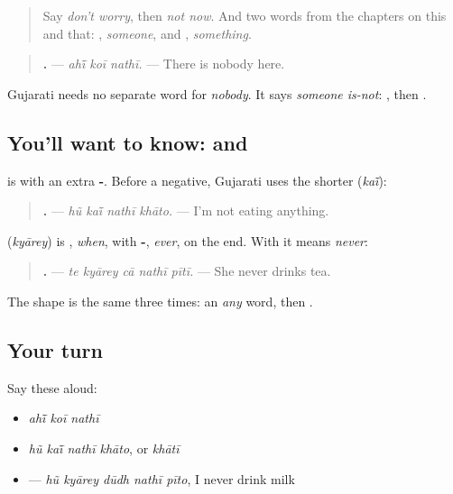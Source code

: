 \label{lesson:GU-C145-koi-nathi}



\begin{quote}
Say \emph{don't worry}, then \emph{not now}. And two words from the chapters on this and that: \textbf{}, \emph{someone}, and \textbf{}, \emph{something}.
\end{quote}

\begin{grammarlens}[title={Grammar Lens: \gu{કોઈ} with \gu{નથી}}]
\begin{quote}
\textbf{  .} — \emph{ahī̃ koī nathī.} — There is nobody here.
\end{quote}

Gujarati needs no separate word for \emph{nobody}. It says \emph{someone is-not}: \textbf{}, then \textbf{}.
\end{grammarlens}

\subsection*{You'll want to know:  and }
\textbf{} is \textbf{} with an extra \textbf{-}. Before a negative, Gujarati uses the shorter \textbf{} (\emph{kaī̃}):

\begin{quote}
\textbf{   .} — \emph{hũ kaī̃ nathī khāto.} — I'm not eating anything.
\end{quote}

\textbf{} (\emph{kyārey}) is \textbf{}, \emph{when}, with \textbf{-}, \emph{ever}, on the end. With \textbf{} it means \emph{never}:

\begin{quote}
\textbf{    .} — \emph{te kyārey cā nathī pītī.} — She never drinks tea.
\end{quote}

The shape is the same three times: an \emph{any} word, then \textbf{}.

\subsection*{Your turn}
Say these aloud:

\begin{itemize}
\raggedright
  \item \emph{ahī̃ koī nathī}
  \item \emph{hũ kaī̃ nathī khāto}, or \emph{khātī}
  \item \textbf{    } — \emph{hũ kyārey dūdh nathī pīto}, I never drink milk
\end{itemize}

